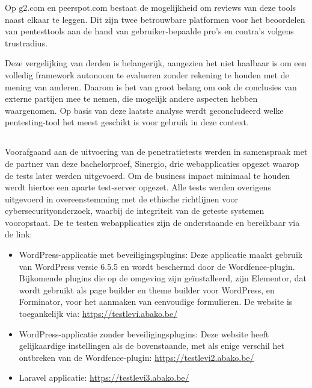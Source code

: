 Op g2.com en peerspot.com bestaat de 
mogelijkheid om reviews van deze tools naast elkaar te leggen. Dit zijn twee betrouwbare platformen voor het beoordelen 
van pentesttools aan de hand van gebruiker-bepaalde pro's en contra's volgens trustradius. 

Deze vergelijking van derden is belangerijk, aangezien het niet haalbaar is om een volledig framework 
autonoom te evalueren zonder rekening te houden met de mening van anderen. Daarom is het van groot belang om ook de 
conclusies van externe partijen mee te nemen, die mogelijk andere 
aspecten hebben waargenomen. Op basis van deze laatste analyse werdt geconcludeerd welke pentesting-tool het meest 
geschikt is voor gebruik in deze context.

\subsection{}
Voorafgaand aan de uitvoering van de penetratietests werden in samenspraak met de partner van deze bachelorproef, Sinergio, drie 
webapplicaties opgezet waarop de tests later werden uitgevoerd. Om de business impact minimaal te houden werdt hiertoe een 
aparte test-server opgezet. Alle tests werden overigens uitgevoerd in overeenstemming met de ethische 
richtlijnen voor cybersecurityonderzoek, waarbij de integriteit van de geteste systemen vooropstaat. De te testen 
webapplicaties zijn de onderstaande en bereikbaar via de link:

\begin{itemize}
    \item WordPress-applicatie met beveiligingsplugins: Deze applicatie maakt gebruik van WordPress versie 6.5.5 en wordt 
    beschermd door de Wordfence-plugin. Bijkomende plugins die op de omgeving zijn geïnstalleerd, zijn Elementor, dat wordt 
    gebruikt als page builder en theme builder voor WordPress, en Forminator, voor het aanmaken van eenvoudige formulieren. 
    De website is toegankelijk via: \url{https://testlevi.abako.be/}
    \item WordPress-applicatie zonder beveiligingsplugins: Deze website heeft gelijkaardige instellingen als de bovenstaande, 
    met als enige verschil het ontbreken van de Wordfence-plugin: \url{https://testlevi2.abako.be/}
    \item Laravel applicatie: \url{https://testlevi3.abako.be/}
\end{itemize}

